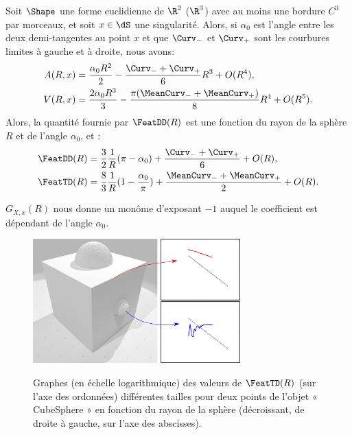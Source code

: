 \begin{definition}
Soit $\Shape$ une forme euclidienne de $\R^2$ (\respp $\R^3$) avec au moins
une bordure $C^3$ par morceaux, et soit $x\in \dS$ une singularité. Alors, si
$\alpha_0$ est l'angle entre les deux demi-tangentes au point $x$ et que
$\Curv_{-}$ et $\Curv_{+}$ sont les courbures limites à gauche et à droite,
nous avons:
\begin{align}
	A(R,x) &= \frac{\alpha_0 R^2}{2} - \frac{\Curv_{-} + \Curv_{+}}{6}R^3 + O(R^4),\\
	V(R,x) &= \frac{2 \alpha_0R^3}{3} - \frac{\pi(\MeanCurv_{-} + \MeanCurv_{+})}{8}R^4 + O(R^5).
\end{align}
Alors, la quantité fournie par $\FeatDD(R)$ est une fonction du rayon de la sphère
$R$ et de l'angle $\alpha_0$, et :
\begin{align}
	\FeatDD(R) &= \frac{3}{2} \frac{1}{R} ( \pi - \alpha_0 )
             + \frac{\Curv_{-} + \Curv_{+}}{6} + O(R),\\
	\FeatTD(R) &= \frac{8}{3} \frac{1}{R} ( 1 - \frac{\alpha_0}{\pi} )
             + \frac{\MeanCurv_{-} + \MeanCurv_{+}}{2} + O(R).
  \label{eq:feature-estimator-singularity}
\end{align}
\end{definition}
$G_{X,x}(R)$ nous donne un monôme d'exposant $-1$ auquel le coefficient est
dépendant de l'angle $\alpha_0$.

\begin{figure}[ht]
\begin{center}
  {\includegraphics[width=8cm]{figures/CubeSpherePlot_ES_NoColor}}
  \caption{Graphes (en échelle logarithmique) des valeurs de $\FeatTD(R)$ (sur
  l'axe des ordonnées) différentes tailles pour deux points de l'objet «
  CubeSphere » en fonction du rayon de la sphère (décroissant, de droite
  à gauche, sur l'axe des abscisses).\label{fig:CubeSpherePlot_ES_NoColor}}
\end{center}
\end{figure}

